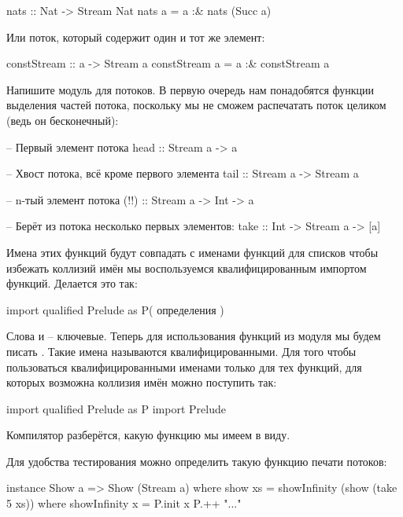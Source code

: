 \begin{code}
nats :: Nat -> Stream Nat
nats a = a :& nats (Succ a) 
\end{code}

Или поток, который содержит один и тот же элемент:


\begin{code}
constStream :: a -> Stream a
constStream a = a :& constStream a 
\end{code}

Напишите модуль для потоков. В первую очередь нам понадобятся функции
выделения частей потока, поскольку мы не сможем распечатать поток
целиком (ведь он бесконечный):


\begin{code}
-- Первый элемент потока
head :: Stream a -> a

-- Хвост потока, всё кроме первого элемента
tail :: Stream a -> Stream a

-- n-тый элемент потока
(!!) :: Stream a -> Int -> a

-- Берёт из потока несколько первых элементов:
take :: Int -> Stream a -> [a]
\end{code}

Имена этих функций будут совпадать с именами функций для списков чтобы
избежать коллизий имён мы воспользуемся квалифицированным импортом
функций. Делается это так:


\begin{code}
import qualified Prelude as P( определения )
\end{code}

Слова   и  -- ключевые.
Теперь для использования функций из модуля  мы будем писать
. Такие имена называются квалифицированными. Для того
чтобы пользоваться квалифицированными именами только для тех функций,
для которых возможна коллизия имён можно поступить так:


\begin{code}
import qualified Prelude as P
import Prelude
\end{code}

Компилятор разберётся, какую функцию мы имеем в виду.

Для удобства тестирования можно определить такую функцию печати потоков:


\begin{code}
instance Show a => Show (Stream a) where
    show xs =  showInfinity (show (take 5 xs))
        where showInfinity x = P.init x  P.++ "..."
\end{code}

